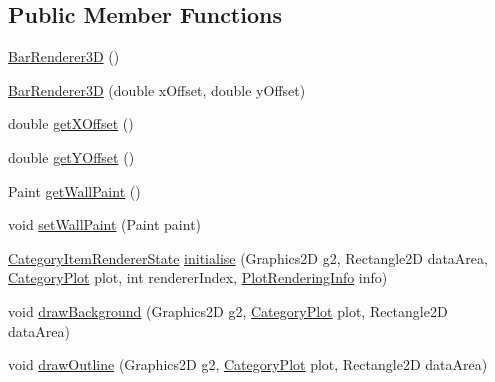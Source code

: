 \subsection*{Public Member Functions}
\begin{DoxyCompactItemize}
\item 
\mbox{\hyperlink{classorg_1_1jfree_1_1chart_1_1renderer_1_1category_1_1_bar_renderer3_d_a62f8e30b4efb701840a2d6e4d3ac60b4}{Bar\+Renderer3D}} ()
\item 
\mbox{\hyperlink{classorg_1_1jfree_1_1chart_1_1renderer_1_1category_1_1_bar_renderer3_d_a5a2e41d5d1eb98f9feb9deda3df04d94}{Bar\+Renderer3D}} (double x\+Offset, double y\+Offset)
\item 
double \mbox{\hyperlink{classorg_1_1jfree_1_1chart_1_1renderer_1_1category_1_1_bar_renderer3_d_acfc9f055dd8b9ac17882a4395996646e}{get\+X\+Offset}} ()
\item 
double \mbox{\hyperlink{classorg_1_1jfree_1_1chart_1_1renderer_1_1category_1_1_bar_renderer3_d_ae0180e0a6256ed5d439f5f00a4f035a9}{get\+Y\+Offset}} ()
\item 
Paint \mbox{\hyperlink{classorg_1_1jfree_1_1chart_1_1renderer_1_1category_1_1_bar_renderer3_d_a4d133ebfc6791eb558ef58409fc69cc5}{get\+Wall\+Paint}} ()
\item 
void \mbox{\hyperlink{classorg_1_1jfree_1_1chart_1_1renderer_1_1category_1_1_bar_renderer3_d_a2476417310293633325cb376fb113727}{set\+Wall\+Paint}} (Paint paint)
\item 
\mbox{\hyperlink{classorg_1_1jfree_1_1chart_1_1renderer_1_1category_1_1_category_item_renderer_state}{Category\+Item\+Renderer\+State}} \mbox{\hyperlink{classorg_1_1jfree_1_1chart_1_1renderer_1_1category_1_1_bar_renderer3_d_a157bf5d34311c199b378b5a53394f64b}{initialise}} (Graphics2D g2, Rectangle2D data\+Area, \mbox{\hyperlink{classorg_1_1jfree_1_1chart_1_1plot_1_1_category_plot}{Category\+Plot}} plot, int renderer\+Index, \mbox{\hyperlink{classorg_1_1jfree_1_1chart_1_1plot_1_1_plot_rendering_info}{Plot\+Rendering\+Info}} info)
\item 
void \mbox{\hyperlink{classorg_1_1jfree_1_1chart_1_1renderer_1_1category_1_1_bar_renderer3_d_a1c2cefdf932ba45954408643ad756289}{draw\+Background}} (Graphics2D g2, \mbox{\hyperlink{classorg_1_1jfree_1_1chart_1_1plot_1_1_category_plot}{Category\+Plot}} plot, Rectangle2D data\+Area)
\item 
void \mbox{\hyperlink{classorg_1_1jfree_1_1chart_1_1renderer_1_1category_1_1_bar_renderer3_d_a184429c6a393380b95ec267550954749}{draw\+Outline}} (Graphics2D g2, \mbox{\hyperlink{classorg_1_1jfree_1_1chart_1_1plot_1_1_category_plot}{Category\+Plot}} plot, Rectangle2D data\+Area)

\end{DoxyCompactItemize}

